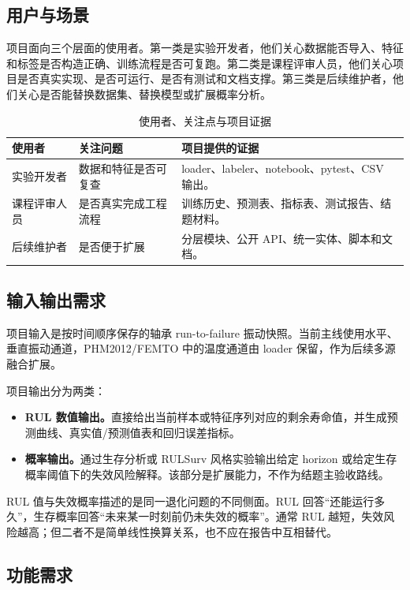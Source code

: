 \documentclass[UTF8,a4paper,12pt]{ctexart}
\begin{document}
\subsection{用户与场景}

项目面向三个层面的使用者。第一类是实验开发者，他们关心数据能否导入、特征和标签是否构造正确、训练流程是否可复跑。第二类是课程评审人员，他们关心项目是否真实实现、是否可运行、是否有测试和文档支撑。第三类是后续维护者，他们关心是否能替换数据集、替换模型或扩展概率分析。

\begin{table}[H]
\centering
\caption{使用者、关注点与项目证据}
\begin{tabularx}{\textwidth}{p{3.2cm}Y Y}
\toprule
使用者 & 关注问题 & 项目提供的证据 \\
\midrule
实验开发者 & 数据和特征是否可复查 & loader、labeler、notebook、pytest、CSV 输出。 \\
课程评审人员 & 是否真实完成工程流程 & 训练历史、预测表、指标表、测试报告、结题材料。 \\
后续维护者 & 是否便于扩展 & 分层模块、公开 API、统一实体、脚本和文档。 \\
\bottomrule
\end{tabularx}
\end{table}

\subsection{输入输出需求}

项目输入是按时间顺序保存的轴承 run-to-failure 振动快照。当前主线使用水平、垂直振动通道，PHM2012/FEMTO 中的温度通道由 loader 保留，作为后续多源融合扩展。

项目输出分为两类：

\begin{itemize}
  \item \textbf{RUL 数值输出。}直接给出当前样本或特征序列对应的剩余寿命值，并生成预测曲线、真实值/预测值表和回归误差指标。
  \item \textbf{概率输出。}通过生存分析或 RULSurv 风格实验输出给定 horizon 或给定生存概率阈值下的失效风险解释。该部分是扩展能力，不作为结题主验收路线。
\end{itemize}

RUL 值与失效概率描述的是同一退化问题的不同侧面。RUL 回答“还能运行多久”，生存概率回答“未来某一时刻前仍未失效的概率”。通常 RUL 越短，失效风险越高；但二者不是简单线性换算关系，也不应在报告中互相替代。

\subsection{功能需求}
\end{document}
